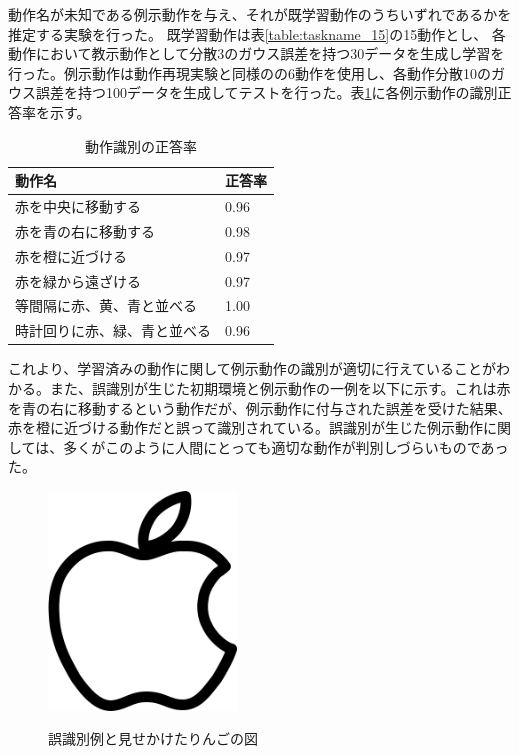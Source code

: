 動作名が未知である例示動作を与え、それが既学習動作のうちいずれであるかを推定する実験を行った。
既学習動作は表\ref{table:taskname_15}の15動作とし、
各動作において教示動作として分散3のガウス誤差を持つ30データを生成し学習を行った。例示動作は動作再現実験と同様のの6動作を使用し、各動作分散10のガウス誤差を持つ100データを生成してテストを行った。表\ref{table:result}に各例示動作の識別正答率を示す。
\begin{table}[h]
	\caption{動作識別の正答率}
	\label{table:result}
  	\begin{tabular}{|l|l|} \hline
    	動作名 & 正答率\\ \hline
   	赤を中央に移動する 		& 0.96
    	\\
    	赤を青の右に移動する 		& 0.98
    	\\
    	赤を橙に近づける 			& 0.97
    	\\
    	赤を緑から遠ざける 			& 0.97
    	\\
    	等間隔に赤、黄、青と並べる 	& 1.00
    	\\
    	時計回りに赤、緑、青と並べる 	& 0.96
    	\\ \hline
  	\end{tabular}
\end{table}
これより、学習済みの動作に関して例示動作の識別が適切に行えていることがわかる。また、誤識別が生じた初期環境と例示動作の一例を以下に示す。これは赤を青の右に移動するという動作だが、例示動作に付与された誤差を受けた結果、赤を橙に近づける動作だと誤って識別されている。誤識別が生じた例示動作に関しては、多くがこのように人間にとっても適切な動作が判別しづらいものであった。



	\begin{figure}[h]
		\begin{center}
			\includegraphics[width=5cm]{apple.png} \\ %
			\caption{誤識別例と見せかけたりんごの図}
		\end{center}
	\end{figure}

